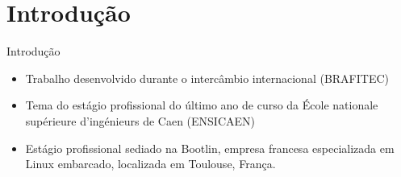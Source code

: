 \section{Introdução}
\begin{frame}{Introdução}
	\begin{itemize}
	    \item Trabalho desenvolvido durante o intercâmbio internacional (BRAFITEC)
	    \item Tema do estágio profissional do último ano de curso da École nationale supérieure d'ingénieurs de Caen (ENSICAEN)
	    \item Estágio profissional sediado na Bootlin, empresa francesa especializada em Linux embarcado, localizada em Toulouse, França.
	\end{itemize}
\end{frame}


